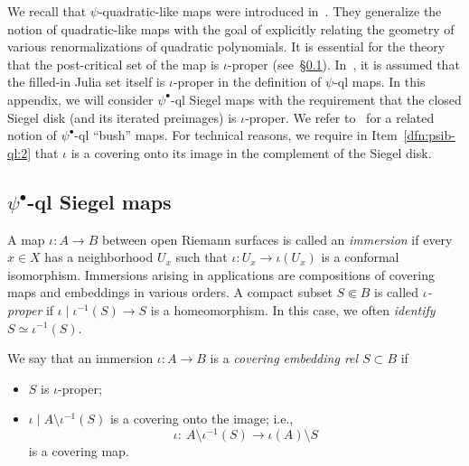 \documentclass[11pt, reqno]{amsart}
\numberwithin{equation}{section}
\theoremstyle{plain}
\theoremstyle{theorem}
\theoremstyle{plain}
\theoremstyle{definition}
\numberwithin{figure}{section}
\begin{document}
We recall that $\psi$-quadratic-like maps were introduced in~\cite{Kah06}. They generalize the notion of quadratic-like maps with the goal of explicitly relating the geometry of various renormalizations of quadratic polynomials. It is essential for the theory that the post-critical set of the map is $\iota$-proper (see~\S\ref{sss:qlb:Defn}). In~\cite{Kah06}, it is assumed that the filled-in Julia set itself is $\iota$-proper in the definition of $\psi$-ql maps. In this appendix, we will consider $\psi^\bullet$-ql Siegel maps  with the requirement that the closed Siegel disk (and its iterated preimages) is $\iota$-proper. We refer to~\cite{DL23} for a related notion of $\psi^\bullet$-ql ``bush'' maps. For technical reasons, we require in Item~\ref{dfn:psib-ql:2} that $\iota$ is a covering onto its image in the complement of the Siegel disk.





\subsection{$\psi^\bullet$-ql Siegel maps}
\label{sss:qlb:Defn}
A map $\iota\colon A\to B$ between open Riemann surfaces is called an \emph{immersion} if every $x\in X$ has a neighborhood $U_x$ such that $\iota\colon  U_x\to \iota(U_x)$ is a conformal isomorphism. Immersions arising in applications are compositions of covering maps and embeddings in various orders. A compact subset $S\Subset B$ is called \emph{$\iota$-proper} if $\iota\mid \iota^{-1}(S)\to S$ is a homeomorphism. In this case, we often \emph{identify} $S\simeq \iota^{-1}(S)$. 

We say that an immersion $\iota\colon A\to B$ is a \emph{covering embedding rel $S\subset B$} if 
\begin{itemize}
  \item $S$ is $\iota$-proper;
  \item $\iota\mid A\setminus \iota^{-1}(S)$ is a covering onto the image; i.e., 
  \[\iota \colon \ A\setminus \iota^{-1}(S)\longrightarrow \iota(A)\setminus S\]
is a covering map. 
\end{itemize}
\end{document}
